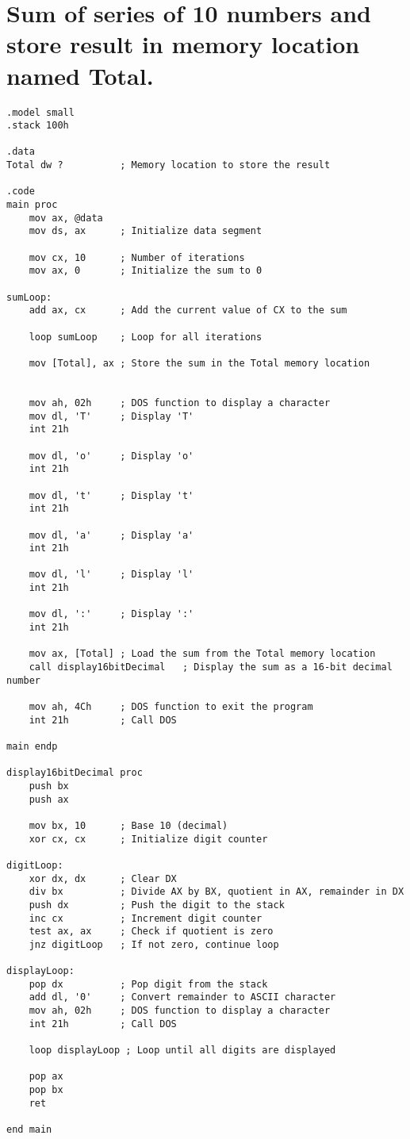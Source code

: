 \documentclass{article}
\begin{document}
\section{Sum of series of 10 numbers and store result in memory location named Total.} 

\begin{lstlisting}[style=asmStyle]
.model small
.stack 100h

.data
Total dw ?          ; Memory location to store the result

.code
main proc
    mov ax, @data
    mov ds, ax      ; Initialize data segment

    mov cx, 10      ; Number of iterations
    mov ax, 0       ; Initialize the sum to 0

sumLoop:
    add ax, cx      ; Add the current value of CX to the sum
         
    loop sumLoop    ; Loop for all iterations

    mov [Total], ax ; Store the sum in the Total memory location

    
    mov ah, 02h     ; DOS function to display a character
    mov dl, 'T'     ; Display 'T'
    int 21h

    mov dl, 'o'     ; Display 'o'
    int 21h

    mov dl, 't'     ; Display 't'
    int 21h

    mov dl, 'a'     ; Display 'a'
    int 21h

    mov dl, 'l'     ; Display 'l'
    int 21h

    mov dl, ':'     ; Display ':'
    int 21h

    mov ax, [Total] ; Load the sum from the Total memory location
    call display16bitDecimal   ; Display the sum as a 16-bit decimal number

    mov ah, 4Ch     ; DOS function to exit the program
    int 21h         ; Call DOS

main endp

display16bitDecimal proc
    push bx
    push ax

    mov bx, 10      ; Base 10 (decimal)
    xor cx, cx      ; Initialize digit counter

digitLoop:
    xor dx, dx      ; Clear DX
    div bx          ; Divide AX by BX, quotient in AX, remainder in DX
    push dx         ; Push the digit to the stack
    inc cx          ; Increment digit counter
    test ax, ax     ; Check if quotient is zero
    jnz digitLoop   ; If not zero, continue loop

displayLoop:
    pop dx          ; Pop digit from the stack
    add dl, '0'     ; Convert remainder to ASCII character
    mov ah, 02h     ; DOS function to display a character
    int 21h         ; Call DOS

    loop displayLoop ; Loop until all digits are displayed

    pop ax
    pop bx
    ret

end main


\end{lstlisting}
\end{document}
